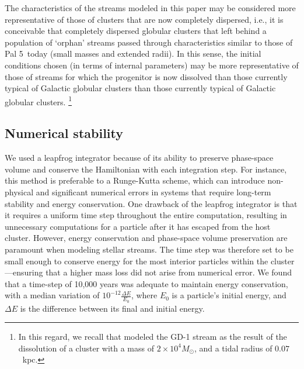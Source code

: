 \documentclass{aa}
\begin{document}
The characteristics of the streams modeled in this paper may be considered more representative of those of clusters that are now completely dispersed, i.e., it is conceivable that completely dispersed globular clusters that left behind a population of `orphan' streams passed through characteristics similar to those of Pal 5~today (small masses and extended radii). In this sense, the initial conditions chosen (in terms of internal parameters) may be more representative of those of streams for which the progenitor is now dissolved \citep[see, for example, the population of streams without progenitors described by][]{2024ApJ...967...89I} than those currently typical of Galactic globular clusters than those currently typical of Galactic globular clusters. \footnote{In this regard, we recall that \citet{2014ApJ...795...95B} modeled the GD-1 stream as the result of the dissolution of a cluster with a mass of $2 \times 10^4 M_\odot$, and a tidal radius of $0.07$~kpc.}




  \subsection{Numerical stability}\label{num_quality}

    We used a leapfrog integrator because of its ability to preserve phase-space volume and conserve the Hamiltonian with each integration step. For instance, this method is preferable to a Runge-Kutta scheme, which can introduce non-physical and significant numerical errors in systems that require long-term stability and energy conservation. One drawback of the leapfrog integrator is that it requires a uniform time step throughout the entire computation, resulting in unnecessary computations for a particle after it has escaped from the host cluster. However, energy conservation and phase-space volume preservation are paramount when modeling stellar streams. The time step was therefore set to be small enough to conserve energy for the most interior particles within the cluster---ensuring that a higher mass loss did not arise from numerical error. We found that a time-step of 10,000 years was adequate to maintain energy conservation, with a median variation of $10^{-12} \frac{\Delta E}{E_0}$, where $E_0$ is a particle's initial energy, and $\Delta E$ is the difference between its final and initial energy. 
    
\end{document}
